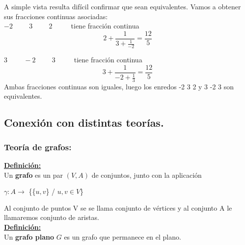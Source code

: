 \documentclass[14pt]{extarticle}
\begin{document}
A simple vista resulta difícil confirmar que sean equivalentes. Vamos a obtener sus fracciones continuas asociadas:\\
$-2 \hspace{1cm} 3 \hspace{1cm} 2 \hspace{1cm}$ tiene fracción continua
\begin{equation}
 2 + \frac{1}{3 + \frac{1}{-2}} = \frac{12}{5}
\end{equation}

$3 \hspace{1cm} -2 \hspace{1cm} 3 \hspace{1cm}$ tiene fracción continua
\begin{equation}
3 + \frac{1}{-2 + \frac{1}{3}} = \frac{12}{5}
\end{equation}
Ambas fracciones continuas son iguales, luego los enredos -2 3 2 y 3 -2 3 son equivalentes. 

\newpage
\subsection{Conexión con distintas teorías.}\label{seccion7}
\begin{center}
	\item \subsubsection{Teoría de grafos:}
\end{center}

\underline{\textbf{Definición:}}\\
Un \textbf{grafo} es un par $ (V,A) $ de conjuntos, junto con la aplicación 
\begin{center}
	 $  \gamma :A \rightarrow$ \{\{$u,v$\} / $u,v \in V$\}  
\end{center}
Al conjunto de puntos V se se llama conjunto de vértices y al conjunto A le llamaremos conjunto de aristas. \\

\underline{\textbf{Definición:}}\\
Un \textbf{grafo plano} $ G $ es un grafo que permanece en el plano.\\
\end{document}
